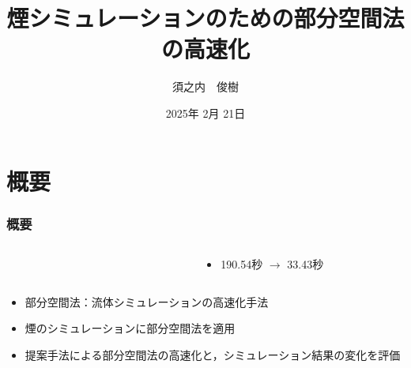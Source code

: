 \documentclass[aspectratio=169,dvipdfmx,hyperref={bookmarks=true}]{beamer}
\title{煙シミュレーションのための部分空間法の高速化}
\author{須之内　俊樹}
\institute{中央大学理工学研究科　情報工学専攻　\\形状情報処理研究室　23N8100018B}
\date{2025年 2月 21日}
\begin{document}
   \begin{frame}
 \maketitle
 \end{frame} 
  
     \section{概要}
 \begin{frame}
 \frametitle{概要}
 \begin{columns}[]
	\begin{column}{0.3\linewidth}
	\end{column}
	\begin{column}{0.3\linewidth}
    \end{column}

	\begin{column}{0.35\linewidth}
	  \begin{block}{}
  		\begin{itemize}
			\item 190.54秒 $\to$ 33.43秒
		\end{itemize}
	\end{block}
    \end{column}
   \end{columns}

  \begin{block}{}
  \begin{itemize}
	\item 部分空間法：流体シミュレーションの高速化手法
	\item 煙のシミュレーションに部分空間法を適用
	\item 提案手法による部分空間法の高速化と，シミュレーション結果の変化を評価
\end{itemize}
\end{block}

 \end{frame}
\end{document}
